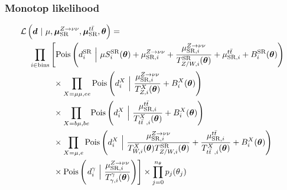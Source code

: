 \documentclass[aspectratio=169,xcolor=dvipsnames,,table,compress]{beamer}
\begin{document}
\begin{frame} \frametitle{Monotop likelihood}
  \vspace{-8mm}
\begin{align*}
    \mathcal{L}\left(\bm{d}~|~ \mu,\muz,\mut,\bm{\theta}\right) = \hspace{-30mm} & \nonumber \\
    \prod_{i\in\mathrm{bins}} & \left[
    \pois\left(d^{\mathrm{SR}}_{i} ~\Big|~ \mu S^{\mathrm{SR}}_{i}(\bm\theta)  + \muzi + \frac{\muzi}{\Ti{\mathrm{SR}}{Z/W}(\bm\theta)} + \muti + B^{\mathrm{SR}}_{i}(\bm\theta)\right) \vphantom{\frac{\muzi}{\Ti{\mu\mu}{Z}(\bm\theta)}}\right. \nonumber \\
    & \phantom{\Big[} \times \prod_{X=\mu\mu,ee} \pois\left(d^{X}_i~\Big|~ \frac{\muzi}{\Ti{X}{Z}(\bm\theta)} + B^{X}_i(\bm\theta) \right) \nonumber \\
    & \phantom{\Big[} \times \prod_{X=b\mu,be}\pois\left(d^{X}_i~\Big|~ \frac{\muti}{\Ti{X}{\ttbar}(\bm\theta)} + B^{X}_i(\bm\theta) \right) \nonumber \\
    & \phantom{\Big[} \times \prod_{X=\mu,e} \pois\left(d^{X}_i~\Big|~ \frac{\muzi}{\Ti{X}{W}(\bm\theta)\Ti{\mathrm{SR}}{Z/W}(\bm\theta)} + \frac{\muti}{\Ti{X}{\ttbar}(\bm\theta)} + B^{X}_i(\bm\theta) \right) \nonumber \\
    & \phantom{\Big[} \times \pois\left(\left.d^\gamma_i~\Big|~ \frac{\muzi}{\Ti\gamma\gamma(\bm\theta)} \right) \right]  \times  \prod_{j=0}^{n_\theta} p_j(\theta_j)
\end{align*}
\end{frame}
\end{document}
